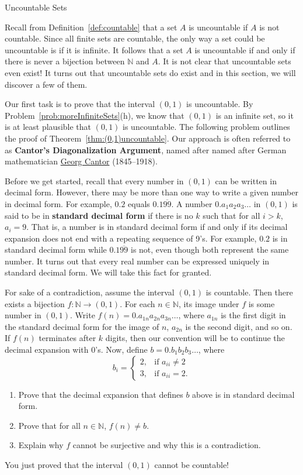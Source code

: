 \begin{section}{Uncountable Sets}

Recall from Definition~\ref{def:countable} that a set $A$ is uncountable if $A$ is not countable.  Since all finite sets are countable, the only way a set could be uncountable is if it is infinite.  It follows that a set $A$ is uncountable if and only if there is never a bijection between $\mathbb{N}$ and $A$.  It is not clear that uncountable sets even exist!  It turns out that uncountable sets do exist and in this section, we will discover a few of them.

Our first task is to prove that the interval $(0,1)$ is uncountable.  By Problem~\ref{prob:moreInfiniteSets}(h), we know that $(0,1)$ is an infinite set, so it is at least plausible that $(0,1)$ is uncountable.  The following problem outlines the proof of Theorem~\ref{thm:(0,1)uncountable}.  Our approach is often referred to as \textbf{Cantor's Diagonalization Argument}, named after named after German mathematician \href{https://en.wikipedia.org/wiki/Georg_Cantor}{Georg Cantor} (1845--1918).

Before we get started, recall that every number in $(0,1)$ can be written in decimal form. However, there may be more than one way to write a given number in decimal form.  For example, $0.2$ equals $0.1\overline{99}$.  A number $0.a_1a_2a_3\ldots$ in $(0,1)$ is said to be in \textbf{standard decimal form} if there is no $k$ such that for all $i>k$, $a_i=9$. That is, a number is in standard decimal form if and only if its decimal expansion does not end with a repeating sequence of 9's. For example, $0.2$ is in standard decimal form while $0.1\overline{99}$ is not, even though both represent the same number. It turns out that every real number can be expressed uniquely in standard decimal form. We will take this fact for granted.

\begin{problem}
For sake of a contradiction, assume the interval $(0,1)$ is countable.  Then there exists a bijection $f:\mathbb{N}\to (0,1)$. For each $n\in\mathbb{N}$, its image under $f$ is some number in $(0,1)$.  Write $f(n)=0.a_{1n}a_{2n}a_{3n}\ldots$, where $a_{1n}$ is the first digit in the standard decimal form for the image of $n$, $a_{2n}$ is the second digit, and so on. If $f(n)$ terminates after $k$ digits, then our convention will be to continue the decimal expansion with 0's. Now, define $b=0.b_1b_2b_3\ldots$, where
\[
b_i=\begin{cases}
2, & \text{if }a_{ii}\neq 2\\
3, & \text{if }a_{ii}=2.
\end{cases}
\]
\begin{enumerate}[label=\textrm{(\alph*)}]
\item Prove that the decimal expansion that defines $b$ above is in standard decimal form.
\item Prove that for all $n\in\mathbb{N}$, $f(n)\neq b$.
\item Explain why $f$ cannot be surjective and why this is a contradiction.
\end{enumerate}
You just proved that the interval $(0,1)$ cannot be countable!
\end{problem}


\end{section}

